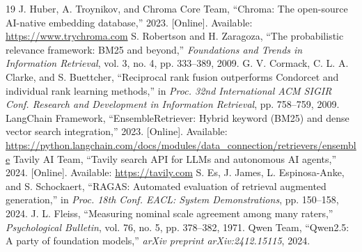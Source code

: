 \documentclass[conference]{IEEEtran}
\begin{document}
\begin{thebibliography}{19}
 J. Huber, A. Troynikov, and Chroma Core Team, ``Chroma: The open-source AI-native embedding database,'' 2023. [Online]. Available: \url{https://www.trychroma.com}
 S. Robertson and H. Zaragoza, ``The probabilistic relevance framework: BM25 and beyond,'' \textit{Foundations and Trends in Information Retrieval}, vol. 3, no. 4, pp. 333--389, 2009.
 G. V. Cormack, C. L. A. Clarke, and S. Buettcher, ``Reciprocal rank fusion outperforms Condorcet and individual rank learning methods,'' in \textit{Proc. 32nd International ACM SIGIR Conf. Research and Development in Information Retrieval}, pp. 758--759, 2009.
 LangChain Framework, ``EnsembleRetriever: Hybrid keyword (BM25) and dense vector search integration,'' 2023. [Online]. Available: \url{https://python.langchain.com/docs/modules/data_connection/retrievers/ensemble}
 Tavily AI Team, ``Tavily search API for LLMs and autonomous AI agents,'' 2024. [Online]. Available: \url{https://tavily.com}
 S. Es, J. James, L. Espinosa-Anke, and S. Schockaert, ``RAGAS: Automated evaluation of retrieval augmented generation,'' in \textit{Proc. 18th Conf. EACL: System Demonstrations}, pp. 150--158, 2024.
 J. L. Fleiss, ``Measuring nominal scale agreement among many raters,'' \textit{Psychological Bulletin}, vol. 76, no. 5, pp. 378--382, 1971.
 Qwen Team, ``Qwen2.5: A party of foundation models,'' \textit{arXiv preprint arXiv:2412.15115}, 2024.
\end{thebibliography}
\end{document}
